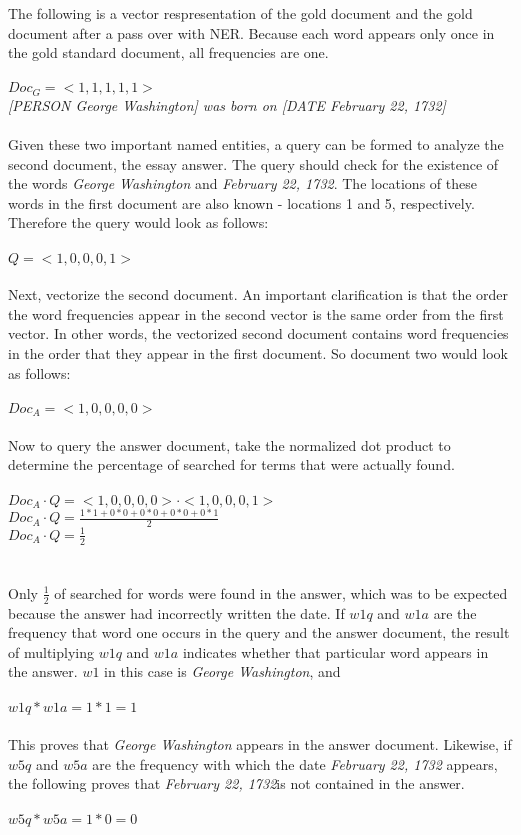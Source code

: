 The following is a vector respresentation of the gold document and the gold document after a pass over with NER. Because each word appears only once in the gold standard document, all frequencies are one.
\\\\
$Doc_G=<1, 1, 1, 1, 1>$\\
\textit{[PERSON George Washington] was born on [DATE February 22, 1732]}
\\\\
Given these two important named entities, a query can be formed to analyze the second document, the essay answer. The query should check for the existence of the words \textit{George Washington} and \textit{February 22, 1732}. The locations of these words in the first document are also known - locations 1 and 5, respectively. Therefore the query would look as follows:
\\\\
$Q=<1, 0, 0 , 0, 1>$
\\\\
Next, vectorize the second document. An important clarification is that the order the word frequencies appear in the second vector is the same order from the first vector. In other words, the vectorized second document contains word frequencies in the order that they appear in the first document. So document two would look as follows:
\\\\
$Doc_A=<1, 0, 0, 0, 0>$
\\\\
Now to query the answer document, take the normalized dot product to determine the percentage of searched for terms that were actually found.
\\\\
$Doc_A \cdot Q = <1, 0, 0, 0, 0> \cdot <1, 0, 0, 0, 1>$\\
$Doc_A \cdot Q = \frac{1*1 + 0*0 + 0*0 + 0*0 + 0*1}{2} $\\
$Doc_A \cdot Q = \frac{1}{2}$\\
\\\\
Only $\frac{1}{2}$ of searched for words were found in the answer, which was to be expected because the answer had incorrectly written the date. If $w1q$ and $w1a$ are the frequency that word one occurs in the query and the answer document, the result of multiplying $w1q$ and $w1a$ indicates whether that particular word appears in the answer. $w1$ in this case is \textit{George Washington}, and
\\\\
$w1q * w1a = 1*1 = 1$
\\\\
This proves that \textit{George Washington} appears in the answer document. Likewise, if $w5q$ and $w5a$ are the frequency with which the date \textit{February 22, 1732} appears, the following proves that \textit{February 22, 1732}is not contained in the answer.
\\\\
$w5q * w5a = 1*0 = 0$
\\\

